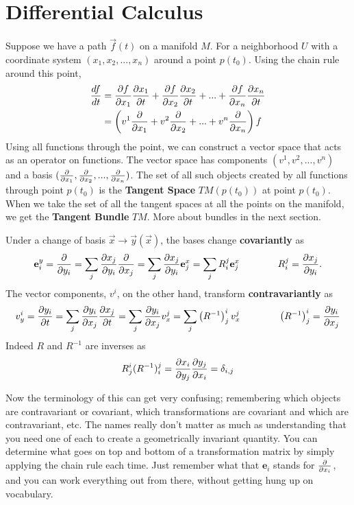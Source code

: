 \chapter{Differential Calculus}

Suppose we have a path $\vec{f}(t)$ on a manifold $M$.  For a neighborhood $U$ with a coordinate system $(x_1, x_2,..., x_n)$ around a point $p(t_0)$.  Using the chain rule around this point,
\begin{align}
  \frac{d f}{d t} & = \frac{\partial f}{\partial x_1}\frac{\partial x_1}{\partial t} + \frac{\partial f}{\partial x_2}\frac{\partial x_2}{\partial t} + ... + \frac{\partial f}{\partial x_n} \frac{\partial x_n}{\partial t} \\
  & = \left(v^1 \frac{\partial }{\partial x_1} + v^2 \frac{\partial }{\partial x_2} + ... + v^n \frac{\partial }{\partial x_n} \right) f
\end{align}
Using all functions through the point, we can construct a vector space that acts as an operator on functions.  The vector space has components $(v^1, v^2, ..., v^n)$ and a basis $(\frac{\partial }{\partial x_1}, \frac{\partial }{\partial x_2},...,\frac{\partial }{\partial x_n})$.  The set of all such objects created by all functions through point $p(t_0)$ is the \textbf{Tangent Space} $TM(p(t_0))$ at point $p(t_0)$.  When we take the set of all the tangent spaces at all the points on the manifold, we get the \textbf{Tangent Bundle} $TM$.  More about bundles in the next section.

Under a change of basis $ \vec{x} \rightarrow \vec{y}(\vec{x} ) $, the bases change \textbf{covariantly} as
\begin{equation}
  \mathbf{e}^y_i = \frac{\partial }{\partial y_i} = \sum_j \frac{\partial x_j}{\partial y_i}\frac{\partial }{\partial x_j} = \sum_j \frac{\partial x_j}{\partial y_i} \mathbf{e}^x_j = \sum_j  R^j_i \mathbf{e}^x_j \qquad \qquad R^j_i = \frac{\partial x_j}{\partial y_i}.
\end{equation}
The vector components, $v^i$, on the other hand, transform \textbf{contravariantly} as
\begin{equation}
  v^i_y = \frac{\partial y_i}{\partial t} = \sum_j \frac{\partial y_i}{\partial x_j} \frac{\partial x_j}{\partial t} = \sum_j \frac{\partial y_i}{\partial x_j} v^j_x
  = \sum_j \left(R^{-1} \right)^i_j v_x^j \qquad \qquad \left(R^{-1}\right)^i_j = \frac{\partial y_i}{\partial x_j}
\end{equation}
Indeed $R$ and $R^{-1}$ are inverses as
\begin{equation}
 R^i_j (R^{-1})^j_i = \frac{\partial x_i}{\partial y_j} \frac{\partial y_j}{\partial x_i} = \delta_{i,j}
\end{equation}

Now the terminology of this can get very confusing; remembering which objects are contravariant or covariant, which transformations are covariant and which are contravariant, etc. The names really don't matter as much as understanding that you need one of each to create a geometrically invariant quantity.  You can determine what goes on top and bottom of a transformation matrix by simply applying the chain rule each time.  Just remember what that $\mathbf{e}_i$ stands for $\frac{\partial }{\partial x_i}$, and you can work everything out from there, without getting hung up on vocabulary.


